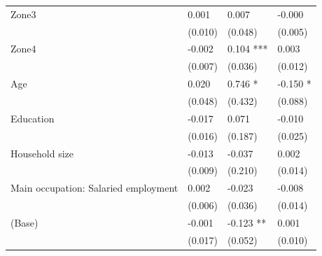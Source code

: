 \begin{tabular}{llll}
Zone3                                &       0.001 &         0.007 &       -0.000 \\
                                     &     (0.010) &       (0.048) &      (0.005) \\
Zone4                                &      -0.002 &     0.104 *** &        0.003 \\
                                     &     (0.007) &       (0.036) &      (0.012) \\
Age                                  &       0.020 &       0.746 * &     -0.150 * \\
                                     &     (0.048) &       (0.432) &      (0.088) \\
Education                            &      -0.017 &         0.071 &       -0.010 \\
                                     &     (0.016) &       (0.187) &      (0.025) \\
Household size                       &      -0.013 &        -0.037 &        0.002 \\
                                     &     (0.009) &       (0.210) &      (0.014) \\
Main occupation: Salaried employment &       0.002 &        -0.023 &       -0.008 \\
                                     &     (0.006) &       (0.036) &      (0.014) \\
(Base)                               &      -0.001 &     -0.123 ** &        0.001 \\
                                     &     (0.017) &       (0.052) &      (0.010) \\
\bottomrule
\end{tabular}
